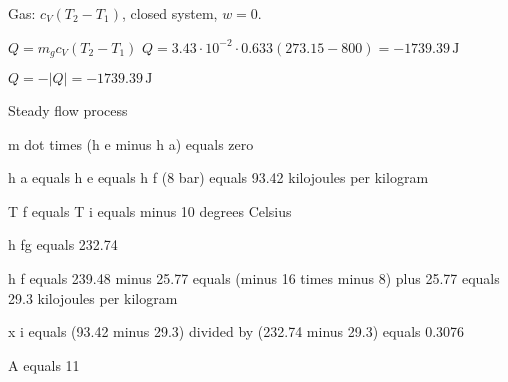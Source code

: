 Gas:  
\( c_V (T_2 - T_1) \), closed system, \( w = 0 \).  

\( Q = m_g c_V (T_2 - T_1) \)  
\( Q = 3.43 \cdot 10^{-2} \cdot 0.633 (273.15 - 800) = -1739.39 \, \text{J} \)  

\( Q = -|Q| = -1739.39 \, \text{J} \)

Steady flow process  

m dot times (h e minus h a) equals zero  

h a equals h e equals h f (8 bar) equals 93.42 kilojoules per kilogram  

T f equals T i equals minus 10 degrees Celsius  

h fg equals 232.74  

h f equals 239.48 minus 25.77 equals (minus 16 times minus 8) plus 25.77 equals 29.3 kilojoules per kilogram  

x i equals (93.42 minus 29.3) divided by (232.74 minus 29.3) equals 0.3076  

A equals 11